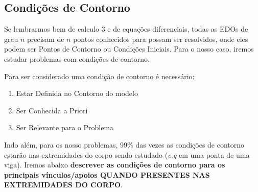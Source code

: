 \documentclass{article}
\begin{document}
            \subsection{Condições de Contorno}
                Se lembrarmos bem de calculo 3 e de equações diferenciais, todas as EDOs de grau $n$ precisam de $n$ pontos conhecidos para possam ser resolvidos, onde eles podem ser Pontos de
                Contorno ou Condições Iniciais. Para o nosso caso, iremos estudar problemas com condições de contorno.

                Para ser considerado uma condição de contorno é necessário:
                \begin{enumerate}
                    \item Estar Definida no Contorno do modelo 
                    \item Ser Conhecida a Priori
                    \item Ser Relevante para o Problema
                \end{enumerate}

                Indo além, para os nosso problemas, 99\% das vezes as condições de contorno estarão nas extremidades do corpo sendo estudado (\emph{e.g} em uma ponta de uma viga). Iremos abaixo
                \textbf{descrever as condições de contorno para os principais vínculos/apoios QUANDO PRESENTES NAS EXTREMIDADES DO CORPO}.





    
\end{document}

